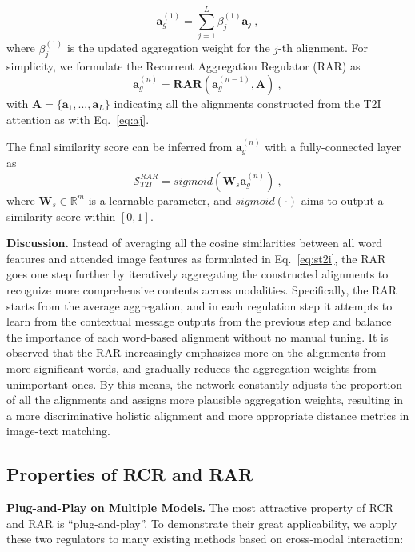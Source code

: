 \documentclass[journal]{IEEEtran}\newcommand{\ignore}[1]{}
\begin{document}
\begin{equation}
\label{eq:updateag}
    \boldsymbol{a}_{g}^{(1)} = \sum_{j=1}^{L} {\beta}_{j}^{(1)} \boldsymbol{a}_{j} \ ,
\end{equation}
where ${\beta}_{j}^{(1)}$ is the updated aggregation weight for the $j$-th alignment.
For simplicity, we formulate the Recurrent Aggregation Regulator (RAR) as 
\begin{equation}
\label{eq:rar}
    \boldsymbol{a}_{g}^{(n)} = \mathbf{RAR}(\boldsymbol{a}_{g}^{(n-1)},\boldsymbol{A}) \ ,
\end{equation}
with $\boldsymbol{A} = \{\boldsymbol{a}_{1},...,\boldsymbol{a}_{L}\}$ indicating all the alignments constructed from the T2I attention as with Eq.~\eqref{eq:aj}.

The final similarity score can be inferred from $\boldsymbol{a}_{g}^{(n)}$ with a fully-connected layer as
\begin{equation}
\label{eq:st2iRAR}
    \mathcal{S}_{T2I}^{RAR} = sigmoid(\boldsymbol{W}_{s}\boldsymbol{a}_{g}^{(n)}) \ ,
\end{equation}
where $\boldsymbol{W}_{s} \in \mathbb{R}^{m}$ is a learnable parameter, and $sigmoid(\cdot)$ aims to output a similarity score within $[0,1]$.

{\bf Discussion.} Instead of averaging all the cosine similarities between all word features and attended image features as formulated in Eq.~\eqref{eq:st2i}, the RAR goes one step further by iteratively aggregating the constructed alignments to recognize more comprehensive contents across modalities. Specifically, the RAR starts from the average aggregation, and in each regulation step it attempts to learn from the contextual message outputs from the previous step and balance the importance of each word-based alignment without no manual tuning. It is observed that the RAR increasingly emphasizes more on the alignments from more significant words, and gradually reduces the aggregation weights from unimportant ones. By this means, the network constantly adjusts the proportion of all the alignments and assigns more plausible aggregation weights, resulting in a more discriminative holistic alignment and more appropriate distance metrics in image-text matching.

\subsection{Properties of RCR and RAR}
{\bf Plug-and-Play on Multiple Models.} The most attractive property of RCR and RAR is “plug-and-play”. To demonstrate their great applicability, we apply these two regulators to many existing methods based on cross-modal interaction:
\end{document}
